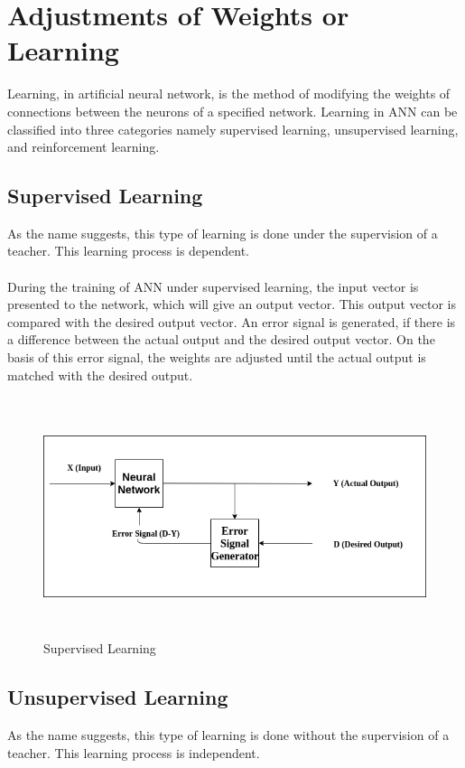\documentclass{report}
\begin{document}
\section{Adjustments of Weights or Learning}
Learning, in artificial neural network, is the method of modifying the weights of connections between the neurons of a specified network. Learning in ANN can be classified into three categories namely supervised learning, unsupervised learning, and reinforcement learning.
\subsection{Supervised Learning}

As the name suggests, this type of learning is done under the supervision of a teacher. This learning process is dependent.
\paragraph{}
During the training of ANN under supervised learning, the input vector is presented to the network, which will give an output vector. This output vector is compared with the desired output vector. An error signal is generated, if there is a difference between the actual output and the desired output vector. On the basis of this error signal, the weights are adjusted until the actual output is matched with the desired output.

\begin{figure}[htbp]
\centering
\includegraphics[height=7cm]{Pictures/Supervised_Learning.png}
\caption{Supervised Learning}
\label{}
\end{figure}

\subsection{Unsupervised Learning}
As the name suggests, this type of learning is done without the supervision of a teacher. This learning process is independent.
\end{document}
